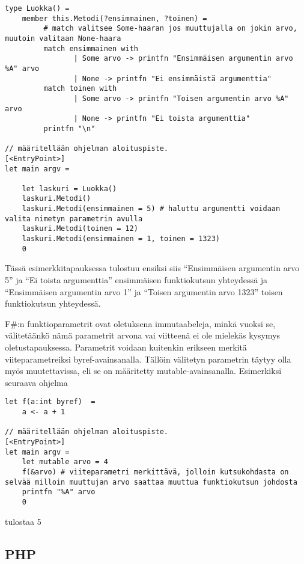 \begin{lstlisting}
type Luokka() =
    member this.Metodi(?ensimmainen, ?toinen) =
         # match valitsee Some-haaran jos muuttujalla on jokin arvo, muutoin valitaan None-haara         
         match ensimmainen with
                | Some arvo -> printfn "Ensimmäisen argumentin arvo %A" arvo
                | None -> printfn "Ei ensimmäistä argumenttia"
         match toinen with
                | Some arvo -> printfn "Toisen argumentin arvo %A" arvo
                | None -> printfn "Ei toista argumenttia"
         printfn "\n"        

// määritellään ohjelman aloituspiste.
[<EntryPoint>]
let main argv =

    let laskuri = Luokka()
    laskuri.Metodi()
    laskuri.Metodi(ensimmainen = 5) # haluttu argumentti voidaan valita nimetyn parametrin avulla
    laskuri.Metodi(toinen = 12)
    laskuri.Metodi(ensimmainen = 1, toinen = 1323)
    0
\end{lstlisting}

Tässä esimerkkitapauksessa tulostuu ensiksi siis “Ensimmäisen argumentin arvo 5” ja “Ei toista argumenttia” ensimmäisen funktiokutsun yhteydessä ja “Ensimmäisen argumentin arvo 1” ja “Toisen argumentin arvo 1323” toisen funktiokutsun yhteydessä.

F\#:n funktioparametrit ovat oletuksena immutaabeleja, minkä vuoksi se, välitetäänkö nämä parametrit arvona vai viitteenä ei ole mielekäs kysymys oletustapauksessa. Parametrit voidaan kuitenkin erikseen merkitä viiteparametreiksi byref-avainsanalla. Tällöin välitetyn parametrin täytyy olla myös muutettavissa, eli se on määritetty mutable-avainsanalla.
Esimerkiksi seuraava ohjelma

\begin{lstlisting}
let f(a:int byref)  =
    a <- a + 1

// määritellään ohjelman aloituspiste.
[<EntryPoint>]
let main argv =
    let mutable arvo = 4
    f(&arvo) # viiteparametri merkittävä, jolloin kutsukohdasta on selvää milloin muuttujan arvo saattaa muuttua funktiokutsun johdosta
    printfn "%A" arvo
    0  
\end{lstlisting}

tulostaa 5


\subsection{PHP}

\lstset{language=PHP,
	basicstyle=\ttfamily,
	breaklines=true,
	columns=fullflexible}

